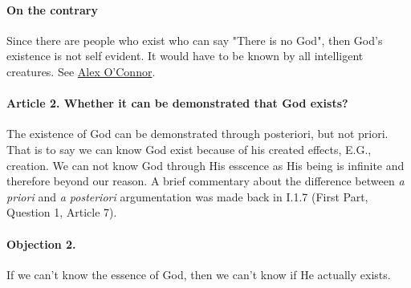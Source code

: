 \documentclass{ucetd}
\begin{document}
\paragraph{On the contrary}
Since there are people who exist who can say "There is no God", then God's existence is not self evident. It would have to be known by all intelligent creatures. See \href{https://en.wikipedia.org/wiki/Alex_O%27Connor}{Alex O'Connor}.

\paragraph{Article 2. Whether it can be demonstrated that God exists?}
The existence of God can be demonstrated through posteriori, but not priori. That is to say we can know God exist because of his created effects, E.G., creation. We can not know God through His esscence as His being is infinite and therefore beyond our reason. A brief commentary about the difference between \textit{a priori} and \textit{a posteriori} argumentation was made back in I.1.7 (First Part, Question 1, Article 7). 
\paragraph{Objection 2.}

If we can't know the essence of God, then we can't know if He actually exists.
\end{document}
